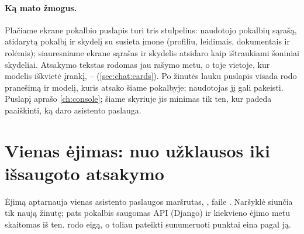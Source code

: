 \paragraph{Ką mato žmogus.} Plačiame ekrane pokalbio puslapis turi tris stulpelius: naudotojo
pokalbių sąrašą, atidarytą pokalbį ir skydelį su susieta įmone (profiliu, leidimais, dokumentais
ir rolėmis); siauresniame ekrane sąrašas ir skydelis atsidaro kaip ištraukiami šoniniai
skydeliai. Atsakymo tekstas rodomas jau rašymo metu, o toje vietoje, kur modelis iškvietė
įrankį, --  (\cref{sec:chat:cards}). Po žinutės lauku puslapis visada rodo
pranešimą  ir modelį, kuris atsako šiame pokalbyje; naudotojas jį gali
pakeisti. Puslapį aprašo \cref{ch:console}; šiame skyriuje jis minimas tik ten, kur padeda
paaiškinti, ką daro asistento paslauga.


\section{Vienas ėjimas: nuo užklausos iki išsaugoto atsakymo}\label{sec:chat:turn}

Ėjimą aptarnauja vienas asistento paslaugos maršrutas, , faile
. Naršyklė siunčia tik naują žinutę; pats pokalbis saugomas API (Django) ir
kiekvieno ėjimo metu skaitomas iš ten.  rodo eigą, o toliau pateikti
sunumeruoti punktai eina pagal ją.

